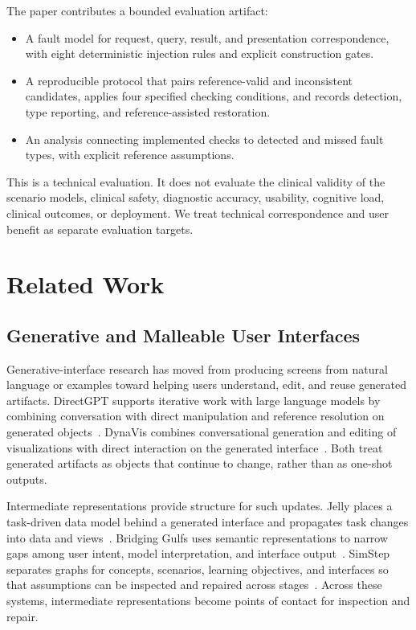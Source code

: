 \documentclass[manuscript,review,anonymous]{acmart}
\begin{document}
The paper contributes a bounded evaluation artifact:

\begin{itemize}
  \item A fault model for request, query, result, and presentation correspondence, with eight deterministic injection rules and explicit construction gates.
  \item A reproducible protocol that pairs reference-valid and inconsistent candidates, applies four specified checking conditions, and records detection, type reporting, and reference-assisted restoration.
  \item An analysis connecting implemented checks to detected and missed fault types, with explicit reference assumptions.
\end{itemize}

This is a technical evaluation. It does not evaluate the clinical validity of the scenario models, clinical safety, diagnostic accuracy, usability, cognitive load, clinical outcomes, or deployment. We treat technical correspondence and user benefit as separate evaluation targets.

\section{Related Work}

\subsection{Generative and Malleable User Interfaces}

Generative-interface research has moved from producing screens from natural language or examples toward helping users understand, edit, and reuse generated artifacts. DirectGPT supports iterative work with large language models by combining conversation with direct manipulation and reference resolution on generated objects~\cite{masson2024directgpt}. DynaVis combines conversational generation and editing of visualizations with direct interaction on the generated interface~\cite{vaithilingam2024dynavis}. Both treat generated artifacts as objects that continue to change, rather than as one-shot outputs.

Intermediate representations provide structure for such updates. Jelly places a task-driven data model behind a generated interface and propagates task changes into data and views~\cite{cao2025jelly}. Bridging Gulfs uses semantic representations to narrow gaps among user intent, model interpretation, and interface output~\cite{park2026bridging}. SimStep separates graphs for concepts, scenarios, learning objectives, and interfaces so that assumptions can be inspected and repaired across stages~\cite{kaputa2026simstep}. Across these systems, intermediate representations become points of contact for inspection and repair.
\end{document}
